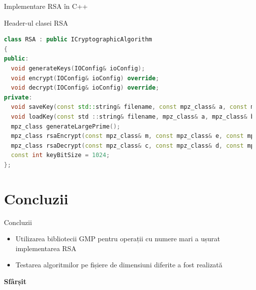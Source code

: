\documentclass{beamer}
\begin{document}
\begin{frame}[fragile]{Implementare RSA în C++}
  \begin{block}{Header-ul clasei RSA}
    \begin{lstlisting}[language=C++]
class RSA : public ICryptographicAlgorithm
{
public:
  void generateKeys(IOConfig& ioConfig);
  void encrypt(IOConfig& ioConfig) override;
  void decrypt(IOConfig& ioConfig) override;
private:
  void saveKey(const std::string& filename, const mpz_class& a, const mpz_class& b);
  void loadKey(const std ::string& filename, mpz_class& a, mpz_class& b);
  mpz_class generateLargePrime();
  mpz_class rsaEncrypt(const mpz_class& m, const mpz_class& e, const mpz_class& n);
  mpz_class rsaDecrypt(const mpz_class& c, const mpz_class& d, const mpz_class& n);
  const int keyBitSize = 1024;
};
    \end{lstlisting}
  \end{block}
\end{frame}

\section{Concluzii}

\begin{frame}{Concluzii}
  \begin{itemize}
    \item Utilizarea bibliotecii GMP pentru operații cu numere mari a ușurat implementarea RSA
    \item Testarea algoritmilor pe fișiere de dimensiuni diferite a fost realizată
  \end{itemize}
\end{frame}

\begin{frame}[plain]
  \centering
  \Huge\bfseries
  \textcolor{myblue}{Sfârșit}
\end{frame}
\end{document}
